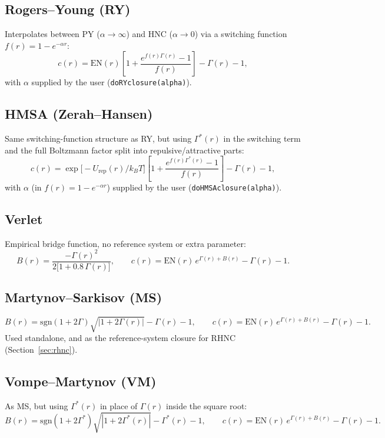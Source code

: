 \documentclass[11pt,a4paper]{article}
\newcommand{\code}[1]{\texttt{#1}}
\begin{document}
\subsection{Rogers--Young (RY) \cite{rogersyoung1984}}
Interpolates between PY ($\alpha\to\infty$) and HNC ($\alpha\to0$) via a
switching function $f(r)=1-e^{-\alpha r}$:
\begin{equation}
  c(r) = \mathrm{EN}(r)\left[1+\frac{e^{f(r)\Gamma(r)}-1}{f(r)}\right] - \Gamma(r) - 1,
\end{equation}
with $\alpha$ supplied by the user (\code{doRYclosure(alpha)}).

\subsection{HMSA (Zerah--Hansen) \cite{zerahhansen1986}}
Same switching-function structure as RY, but using $\Gamma^*(r)$ in the
switching term and the full Boltzmann factor split into repulsive/attractive
parts:
\begin{equation}
  c(r) = \exp\!\big[-U_{\mathrm{rep}}(r)/k_BT\big]\left[1+\frac{e^{f(r)\Gamma^*(r)}-1}{f(r)}\right] - \Gamma(r) - 1,
\end{equation}
with $\alpha$ (in $f(r)=1-e^{-\alpha r}$) supplied by the user
(\code{doHMSAclosure(alpha)}).

\subsection{Verlet \cite{verlet1980,verlet1981}}
Empirical bridge function, no reference system or extra parameter:
\begin{equation}
  B(r) = \frac{-\Gamma(r)^2}{2\big[1+0.8\,\Gamma(r)\big]}, \qquad
  c(r) = \mathrm{EN}(r)\,e^{\Gamma(r)+B(r)} - \Gamma(r) - 1.
\end{equation}

\subsection{Martynov--Sarkisov (MS) \cite{martynovsarkisov1983}}
\label{sec:ms}
\begin{equation}
  B(r) = \mathrm{sgn}(1{+}2\Gamma)\sqrt{|1+2\Gamma(r)|} - \Gamma(r) - 1, \qquad
  c(r) = \mathrm{EN}(r)\,e^{\Gamma(r)+B(r)} - \Gamma(r) - 1.
\end{equation}
Used standalone, and as the reference-system closure for RHNC
(Section~\ref{sec:rhnc}).

\subsection{Vompe--Martynov (VM) \cite{vompemartynov1994}}
As MS, but using $\Gamma^*(r)$ in place of $\Gamma(r)$ inside the square root:
\begin{equation}
  B(r) = \mathrm{sgn}(1{+}2\Gamma^*)\sqrt{|1+2\Gamma^*(r)|} - \Gamma^*(r) - 1, \qquad
  c(r) = \mathrm{EN}(r)\,e^{\Gamma(r)+B(r)} - \Gamma(r) - 1.
\end{equation}
\end{document}
